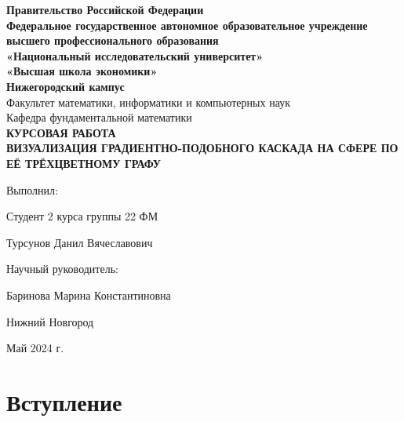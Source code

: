 


	\setcounter{page}{1}
	
	\begin{center} 
		\textbf{Правительство Российской Федерации}
		\\ \textbf{Федеральное государственное автономное образовательное учреждение}
		\\ \textbf{высшего профессионального образования}
		\\ \textbf{«Национальный исследовательский университет»}
		\\ \textbf{«Высшая школа экономики»}
		\\ \textbf{Нижегородский кампус}
		\vspace{3cm}
		\\ Факультет математики, информатики и компьютерных наук
		\\ Кафедра фундаментальной математики
		\vspace{3cm}
		\\ \large\textbf{КУРСОВАЯ РАБОТА}
		\vspace{0.3cm}
		\\ \large\textbf{ВИЗУАЛИЗАЦИЯ ГРАДИЕНТНО-ПОДОБНОГО КАСКАДА НА СФЕРЕ ПО ЕЁ ТРЁХЦВЕТНОМУ ГРАФУ}
	\end{center}
	
	\vspace{3cm}\hspace{8cm} Выполнил: 
	\par \hspace{8cm} Студент 2 курса группы 22 ФМ 
	\par \hspace{8cm} Турсунов Данил Вячеславович
	\par \vspace{0.8cm} \hspace{8cm} Научный руководитель:
	\par \hspace{8cm} Баринова Марина Константиновна
	\begin{center} 
		\vspace{4cm} Нижний Новгород
		\par Май 2024 г.
	\end{center}
	\newpage
	
	\tableofcontents
	\newpage

	\section{Вступление}

